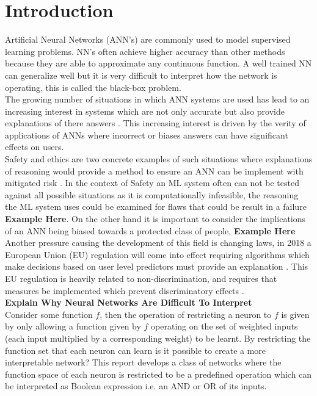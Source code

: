 \chapter{Introduction}\label{C:intro}
Artificial Neural Networks (ANN's) are commonly used to model supervised learning problems. NN's often achieve higher accuracy than other methods because they are able to approximate any continuous function. A well trained NN can generalize well but it is very difficult to interpret how the network is operating, this is called the black-box problem. \\

The growing number of situations in which ANN systems are used has lead to an increasing interest in systems which are not only accurate but also provide explanations of there answers \cite{doshi2017towards}. This increasing interest is driven by the verity of applications of ANNs where incorrect or biases answers can have significant effects on users.\\

Safety and ethics are two concrete examples of such situations where explanations of reasoning would provide a method to ensure an ANN can be implement with mitigated risk \cite{doshi2017towards}. In the context of Safety an ML system often can not be tested against all possible situations as it is computationally infeasible, the reasoning the ML system uses could be examined for flaws that could be result in a failure \textbf{Example Here}. On the other hand it is important to consider the implications of an ANN being biased towards a protected class of people, \textbf{Example Here}\\

Another pressure causing the development of this field is changing laws, in 2018 a European Union (EU) regulation will come into effect requiring algorithms which make decisions based on user level predictors must provide an explanation \cite{goodman2016european}. This EU regulation is heavily related to non-discrimination, and requires that measures be implemented which prevent discriminatory effects \cite{goodman2016european}.\\

\textbf{Explain Why Neural Networks Are Difficult To Interpret}\\

Consider some function $f$, then the operation of restricting a neuron to $f$ is given by only allowing a function given by $f$ operating on the set of weighted inputs (each input multiplied by a corresponding weight) to be learnt. By restricting the function set that each neuron can learn is it possible to create a more interpretable network? This report develops a class of networks where the function space of each neuron is restricted to be a predefined operation which can be interpreted as Boolean expression i.e. an AND or OR of its inputs.\\

